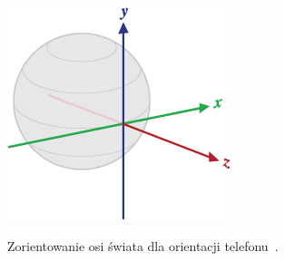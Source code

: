 \begin{figure}[!ht]
 \begin{center}
  \scalebox{0.6}
  {
   \includegraphics{figures/orientation_axes.png}
  }
 \end{center}
 \caption{Zorientowanie osi świata dla orientacji telefonu~\cite{and:doc:world:axes}.}
 \label{fig:orientation_axes}
\end{figure}
